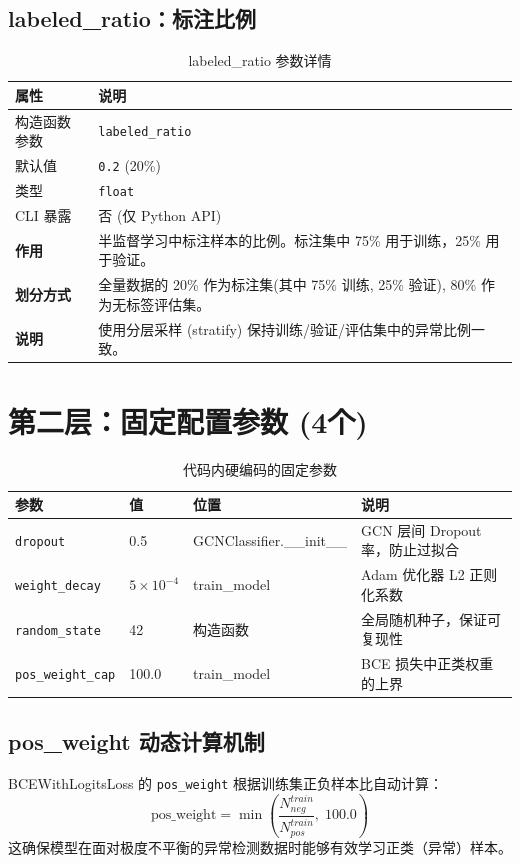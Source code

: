 \documentclass[11pt,a4paper]{ctexart}
\begin{document}
\subsection{labeled\_ratio：标注比例}

\begin{table}[H]\centering\caption{labeled\_ratio 参数详情}\small
\begin{tabular}{lp{10cm}}
\toprule
属性 & 说明 \\
\midrule
构造函数参数 & \texttt{labeled\_ratio} \\
默认值 & \texttt{0.2} (20\%) \\
类型 & \texttt{float} \\
CLI 暴露 & 否 (仅 Python API) \\
\midrule
\textbf{作用} & 半监督学习中标注样本的比例。标注集中 75\% 用于训练，25\% 用于验证。\\
\textbf{划分方式} & 全量数据的 20\% 作为标注集(其中 75\% 训练, 25\% 验证), 80\% 作为无标签评估集。\\
\textbf{说明} & 使用分层采样 (stratify) 保持训练/验证/评估集中的异常比例一致。\\
\bottomrule
\end{tabular}\end{table}

\section{第二层：固定配置参数 (4个)}

\begin{table}[H]\centering\caption{代码内硬编码的固定参数}\small
\begin{tabular}{lllp{6cm}}
\toprule
参数 & 值 & 位置 & 说明 \\
\midrule
\texttt{dropout} & 0.5 & GCNClassifier.\_\_init\_\_ & GCN 层间 Dropout 率，防止过拟合 \\
\texttt{weight\_decay} & $5\times 10^{-4}$ & train\_model & Adam 优化器 L2 正则化系数 \\
\texttt{random\_state} & 42 & 构造函数 & 全局随机种子，保证可复现性 \\
\texttt{pos\_weight\_cap} & 100.0 & train\_model & BCE 损失中正类权重的上界 \\
\bottomrule
\end{tabular}\end{table}

\subsection{pos\_weight 动态计算机制}
BCEWithLogitsLoss 的 \texttt{pos\_weight} 根据训练集正负样本比自动计算：
\[
\text{pos\_weight} = \min\left(\frac{N_{neg}^{train}}{N_{pos}^{train}},\; 100.0\right)
\]
这确保模型在面对极度不平衡的异常检测数据时能够有效学习正类（异常）样本。
\end{document}
